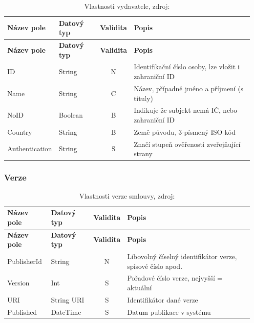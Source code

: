 \begin{center}
\begin{longtable}{lp{20mm}cp{65mm}}
\label{grid_mlmmh} \\
\multicolumn{1}{l}{\textbf{Název pole}} & 
\multicolumn{1}{l}{\textbf{Datový typ}} & 
\multicolumn{1}{l}{\textbf{Validita}} & 
\multicolumn{1}{l}{\textbf{Popis}} \\ \hline 
\endfirsthead
\multicolumn{1}{l}{\textbf{Název pole}} & 
\multicolumn{1}{l}{\textbf{Datový typ}} & 
\multicolumn{1}{l}{\textbf{Validita}} & 
\multicolumn{1}{l}{\textbf{Popis}} \\ \hline 
\hline
\endhead
\endfoot
\caption{Vlastnosti vydavatele, zdroj:\protect\cite{metodika}}
\endlastfoot
ID & String & N & Identifikační číslo osoby, lze vložit i zahraniční ID \\
\rowcolor{validateC}Name & String & C & Název, případně jméno a příjmení (s tituly) \\
\rowcolor{validateB}NoID & Boolean & B & Indikuje že subjekt nemá IČ, nebo zahraniční ID \\
\rowcolor{validateB}Country & String & B & Země původu, 3-písmený ISO kód \\
\rowcolor{validateS}Authentication & String & S & Značí stupeň ověřenosti zveřejňující strany \\
\end{longtable}
\end{center}

\newpage

\subsubsection*{Verze}

\begin{center}
\begin{longtable}{lp{20mm}cp{65mm}}
\label{grid_mlmmh} \\
\multicolumn{1}{l}{\textbf{Název pole}} & 
\multicolumn{1}{l}{\textbf{Datový typ}} & 
\multicolumn{1}{l}{\textbf{Validita}} & 
\multicolumn{1}{l}{\textbf{Popis}} \\ \hline 
\endfirsthead
\multicolumn{1}{l}{\textbf{Název pole}} & 
\multicolumn{1}{l}{\textbf{Datový typ}} & 
\multicolumn{1}{l}{\textbf{Validita}} & 
\multicolumn{1}{l}{\textbf{Popis}} \\ \hline 
\hline
\endhead
\endfoot
\caption{Vlastnosti verze smlouvy, zdroj:\protect\cite{metodika}}
\endlastfoot
PublisherId & String & N & Libovolný číselný identifikátor verze, spisové číslo apod. \\
\rowcolor{validateS}Version & Int & S & Pořadové číslo verze, nejvyšší = aktuální \\
\rowcolor{validateS}URI & String URI & S & Identifikátor dané verze \\
\rowcolor{validateS}Published & DateTime & S & Datum publikace v systému \\
\end{longtable}
\end{center}

